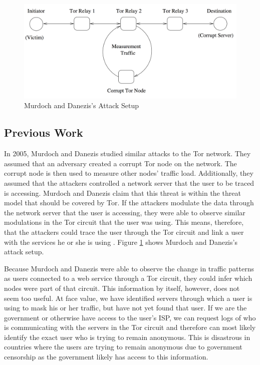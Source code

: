 \documentclass[12pt,journal]{IEEEtran}
\begin{document}
\begin{figure}

 \center
  \includegraphics[width=\textwidth]{figures/murdochattacksetup.png}
  \caption{Murdoch and Danezis's Attack Setup \cite{Murdoch:2005:LTA:1058433.1059390}}
  \label{murdochsetup}
\end{figure}

\subsection{Previous Work}
In 2005, Murdoch and Danezis studied similar attacks to the Tor network. They assumed that an adversary created a corrupt Tor node on the network. The corrupt node is then used to measure other nodes' traffic load. Additionally, they assumed that the attackers controlled a network server that the user to be traced is accessing. Murdoch and Danezis claim that this threat is within the threat model that should be covered by Tor. If the attackers modulate the data through the network server that the user is accessing, they were able to observe similar modulations in the Tor circuit that the user was using. This means, therefore, that the attackers could trace the user through the Tor circuit and link a user with the services he or she is using \cite{Murdoch:2005:LTA:1058433.1059390}. Figure \ref{murdochsetup} shows Murdoch and Danezis's attack setup.
\par
Because Murdoch and Danezis were able to observe the change in traffic patterns as users connected to a web service through a Tor circuit, they could infer which nodes were part of that circuit. This information by itself, however, does not seem too useful. At face value, we have identified servers through which a user is using to mask his or her traffic, but have not yet found that user. If we are the government or otherwise have access to the user's ISP, we can request logs of who is communicating with the servers in the Tor circuit and therefore can most likely identify the exact user who is trying to remain anonymous. This is disastrous in countries where the users are trying to remain anonymous due to government censorship as the government likely has access to this information.
\end{document}

